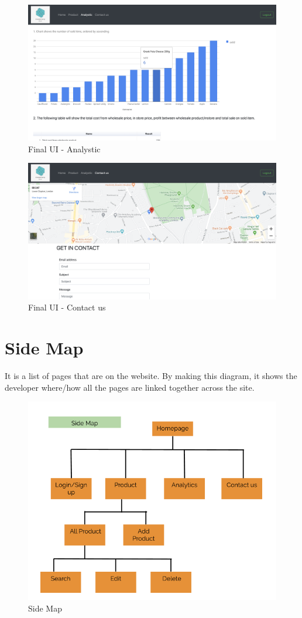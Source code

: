 \begin{figure}[H]
\centering
    \includegraphics[scale=0.27]
    {FinalUI/analystic.png}
    \caption{Final UI - Analystic}
    \label{fig:Final UI - Analystic}
\end{figure}

\begin{figure}[H]
\centering
    \includegraphics[scale=0.24]
    {FinalUI/contactus.png}
    \caption{Final UI - Contact us}
    \label{fig:Final UI - Contact us}
\end{figure}

\section{Side Map}
It is a list of pages that are on the website. By making this diagram, it shows the developer where/how all the pages are linked together across the site.

\begin{figure}[H]
\centering
    \includegraphics[scale=0.52]
    {Diagrams/sidemap.png}
    \caption{Side Map}
    \label{fig:Side map}
\end{figure}